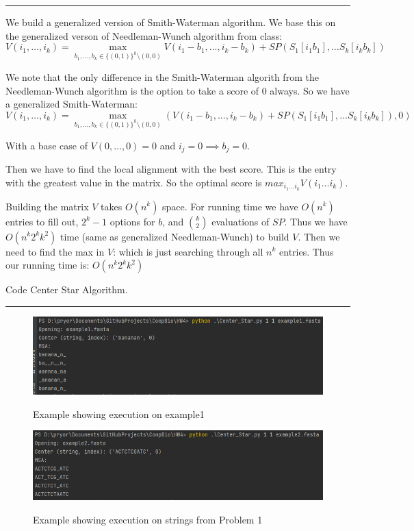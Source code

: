 \documentclass[11pt]{article}
\begin{document}
\hrule

We build a generalized version of Smith-Waterman algorithm.
We base this on the generalized verson of Needleman-Wunch algorithm from class:
$$V(i_1, \dots, i_k) = \max _{b_1, \dots, b_k \in \{(0,1)\}^k \setminus (0,0) } V(i_1 - b_1, \dots, i_k - b_k) + SP(S_1[i_1 b_1], \dots S_k[i_k b_k])$$

We note that the only difference in the Smith-Waterman algorith from the Needleman-Wunch algorithm is the option to take a score of 0 always.
So we have a generalized Smith-Waterman:
$$V(i_1, \dots, i_k) = \max _{b_1, \dots, b_k \in \{(0,1)\}^k \setminus (0,0) } (V(i_1 - b_1, \dots, i_k - b_k) + SP(S_1[i_1 b_1], \dots S_k[i_k b_k]), 0)$$

With a base case of $V(0, \dots, 0) = 0$ and $i_j = 0 \implies b_j = 0$.

Then we have to find the local alignment with the best score. This is the entry with the greatest value in the matrix.
So the optimal score is $max_{i_1 \dots i_k} V(i_1 \dots i_k)$.

Building the matrix $V$ takes $O(n^k)$ space. For running time we have $O(n^k)$ entries to fill out, $2^k - 1$ options for $b$, and $k \choose 2$ evaluations of $SP$.
Thus we have $O(n^k 2^k k^2)$ time (same as generalized Needleman-Wunch) to build $V$.
Then we need to find the max in $V$: which is just searching through all $n^k$ entries.
Thus our running time is: $O(n^k 2^k k^2)$

Code Center Star Algorithm.

\hrule


\begin{figure}[h] 
    \centering
    \includegraphics[width=0.55 \linewidth]{example1.png}
    \label{fig:}
    \caption{Example showing execution on example1}
\end{figure}

\begin{figure}[h] 
    \centering
    \includegraphics[width=0.55 \linewidth]{example2.png}
    \label{fig:}
    \caption{Example showing execution on strings from Problem 1}
\end{figure}




\lstset{style=mystyle}

\end{document}
